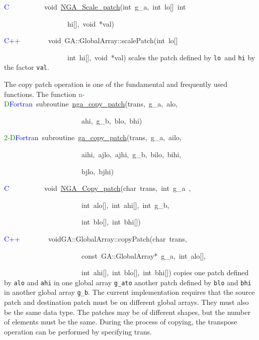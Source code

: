 \textcolor{blue}{C}~~~~~~~~~~void~\href{http://www.emsl.pnl.gov/docs/global/c_nga_ops.html\#ga_scale_patch}{NGA\_{}Scale\_{}patch}(int~g\_a,~int~lo{[}{]}~int~

~~~~~~~~~~~~~~~~~~hi{[}{]},~void~{*}val)~

\textcolor{blue}{C++}~~~~~~~~void~GA::GlobalArray::scalePatch(int~lo{[}{]}~

~~~~~~~~~~~~~~~~~~int~hi{[}{]},~void~{*}val)
scales the patch defined by \texttt{lo }and \texttt{hi} by the factor
\texttt{val}.

The copy patch operation is one of the fundamental and frequently
used functions. The function
\textcolor{green}{n-D}\textcolor{blue}{Fortran}~subroutine~\href{http://www.emsl.pnl.gov/docs/global/ga_ops.html\#ga_copy_patch}{nga\_{}copy\_{}patch}(trans,~g\_a,~alo,~

~~~~~~~~~~~~~~~~~~~~~~ahi,~g\_b,~blo,~bhi)~

\textcolor{green}{2-D}\textcolor{blue}{Fortran}~subroutine~\href{http://www.emsl.pnl.gov/docs/global/ga_ops.html\#ga_copy_patch}{ga\_{}copy\_{}patch}(trans,~g\_a,~ailo,~

~~~~~~~~~~~~~~~~~~~~~~aihi,~ajlo,~ajhi,~g\_b,~bilo,~bihi,~

~~~~~~~~~~~~~~~~~~~~~~bjlo,~bjhi)~

\textcolor{blue}{C~}~~~~~~~~~void~\href{http://www.emsl.pnl.gov/docs/global/c_nga_ops.html\#ga_copy_patch}{NGA\_{}Copy\_{}patch}(char~trans,~int~g\_a~,~

~~~~~~~~~~~~~~~~~~~~~~int~alo{[}{]},~int~ahi{[}{]},~int~g\_b,~

~~~~~~~~~~~~~~~~~~~~~~int~blo{[}{]},~int~bhi{[}{]})~

\textcolor{blue}{C++}~~~~~~~~voidGA::GlobalArray::copyPatch(char~trans,~

~~~~~~~~~~~~~~~~~~~~~~const~GA::GlobalArray{*}~g\_a,~int~alo{[}{]},~

~~~~~~~~~~~~~~~~~~~~~~int~ahi{[}{]},~int~blo{[}{]},~int~bhi{[}{]})
copies one patch defined by \texttt{alo} and \texttt{ahi} in one global
array \texttt{g\_ato} another patch defined by \texttt{blo} and \texttt{bhi}
in another global array \texttt{g\_b}. The current implementation
requires that the source patch and destination patch must be on different
global arrays. They must also be the same data type. The patches may
be of different shapes, but the number of elements must be the same.
During the process of copying, the transpose operation can be performed
by specifying trans.

